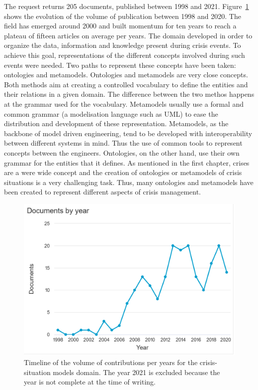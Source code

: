 The request returns 205 documents, published between 1998 and 2021.
Figure~\ref{literature:situation-models-hist} shows the evolution of the volume of publication between 1998 and 2020.
The field has emerged around 2000 and built momentum for ten years to reach a plateau of fifteen articles on average per years.
The domain developed in order to organize the data, information and knowledge present during crisis events.
To achieve this goal, representations of the different concepts involved during such events were needed.
Two paths to represent these concepts have been taken: ontologies and metamodels.
Ontologies and metamodels are very close concepts.
Both methods aim at creating a controlled vocabulary to define the entities and their relations in a given domain.
The difference between the two methos happens at the grammar used for the vocabulary.
Metamodels usually use a formal and common grammar (a modelisation language such as UML) to ease the distribution and development of these representation.
Metamodels, as the backbone of model driven engineering, tend to be developed with interoperability between different systems in mind.
Thus the use of common tools to represent concepts between the engineers.
Ontologies, on the other hand, use their own grammar for the entities that it defines.
As mentioned in the first chapter, crises are a were wide concept and the creation of ontologies or metamodels of crisis situations is a very challenging task.
Thus, many ontologies and metamodels have been created to represent different aspects of crisis management.

\begin{figure}[htb]
    \includegraphics[width=\textwidth]{figures/chap-2/situation-models-hist.pdf}
    \caption{Timeline of the volume of contributions per years for the crisis-situation models domain. The year 2021 is excluded because the year is not complete at the time of writing.}
    \label{literature:situation-models-hist}
\end{figure}

